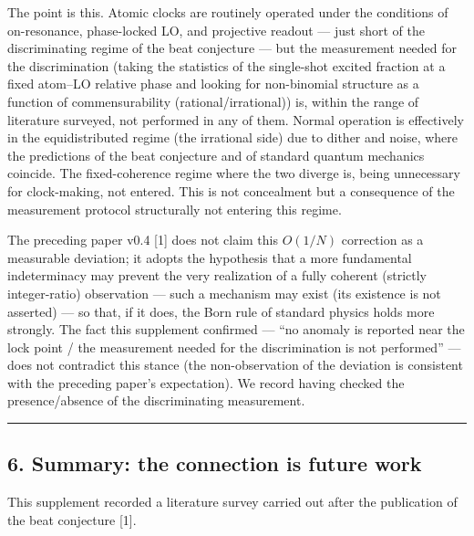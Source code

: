 \documentclass[
]{ltjsarticle}
\begin{document}
The point is this. Atomic clocks are routinely operated under the
conditions of on-resonance, phase-locked LO, and projective readout ---
just short of the discriminating regime of the beat conjecture --- but
the measurement needed for the discrimination (taking the statistics of
the single-shot excited fraction at a fixed atom--LO relative phase and
looking for non-binomial structure as a function of commensurability
(rational/irrational)) is, within the range of literature surveyed, not
performed in any of them. Normal operation is effectively in the
equidistributed regime (the irrational side) due to dither and noise,
where the predictions of the beat conjecture and of standard quantum
mechanics coincide. The fixed-coherence regime where the two diverge is,
being unnecessary for clock-making, not entered. This is not concealment
but a consequence of the measurement protocol structurally not entering
this regime.

The preceding paper v0.4 {[}1{]} does not claim this \(O(1/N)\)
correction as a measurable deviation; it adopts the hypothesis that a
more fundamental indeterminacy may prevent the very realization of a
fully coherent (strictly integer-ratio) observation --- such a mechanism
may exist (its existence is not asserted) --- so that, if it does, the
Born rule of standard physics holds more strongly. The fact this
supplement confirmed --- ``no anomaly is reported near the lock point /
the measurement needed for the discrimination is not performed'' ---
does not contradict this stance (the non-observation of the deviation is
consistent with the preceding paper's expectation). We record having
checked the presence/absence of the discriminating measurement.

\begin{center}\rule{0.5\linewidth}{0.5pt}\end{center}

\subsection{6. Summary: the connection is future
work}\label{summary-the-connection-is-future-work}

This supplement recorded a literature survey carried out after the
publication of the beat conjecture {[}1{]}.
\end{document}

